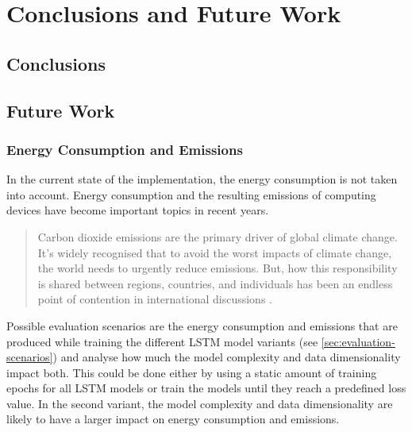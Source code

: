 

\chapter{Conclusions and Future Work}
\label{ch:conclusions-and-future-work}

    \section{Conclusions}
    \label{sec:conclusions}



    \section{Future Work}
    \label{sec:future-work}


        \subsection{Energy Consumption and \COTWO Emissions}
        \label{sec:energy-consumption-future-work}

            In the current state of the implementation, the energy consumption is not taken into account.
            Energy consumption and the resulting \COTWO emissions of computing devices have become important topics in recent years.

            \begin{quote}
                Carbon dioxide emissions are the primary driver of global climate change. It's widely recognised that to avoid the worst impacts of climate change, the world needs to urgently reduce emissions. But, how this responsibility is shared between regions, countries, and individuals has been an endless point of contention in international discussions \cite{ritchieCOGreenhouseGas2020}. 
            \end{quote}

            Possible evaluation scenarios are the energy consumption and \COTWO emissions that are produced while training the different LSTM model variants (see \ref{sec:evaluation-scenarios}) and analyse how much the model complexity and data dimensionality impact both. 
            This could be done either by using a static amount of training epochs for all LSTM models or train the models until they reach a predefined loss value. In the second variant, the model complexity and data dimensionality are likely to have a larger impact on energy consumption and \COTWO emissions.

